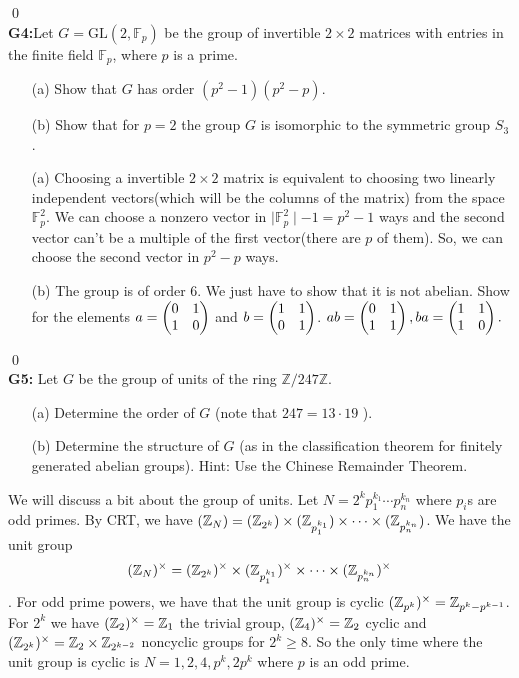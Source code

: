 \qed\\
\textbf{G4:}Let $G=\mathrm{GL}\left(2, \mathbb{F}_p\right)$ be the group of invertible $2 \times 2$ matrices with entries in the finite field $\mathbb{F}_p$, where $p$ is a prime.
\begin{itemize}
	\item[(a)] Show that $G$ has order $\left(p^2-1\right)\left(p^2-p\right)$.
	\item[(b)] Show that for $p=2$ the group $G$ is isomorphic to the symmetric group $S_3$.
\end{itemize}
\soln
\begin{itemize}
	\item[(a)] Choosing a invertible $ 2\times2 $ matrix is equivalent to choosing two linearly independent vectors(which will be the columns of the matrix) from the space $ \mathbb{F}_p^2 $. We can choose a nonzero vector in $\mid \mathbb{F}_p^2\mid -1 =  p^2-1 $ ways and the second vector can't be a multiple of the first vector(there are $ p $ of them). So, we can choose the second vector in $ p^2-p $ ways.
	\item[(b)] The group is of order $ 6 $. We just have to show that it is not abelian. Show for the elements $a= \begin{pmatrix} 0 & 1\\ 1 & 0 \end{pmatrix} $ and $b= \begin{pmatrix} 1 & 1\\ 0 & 1 \end{pmatrix} $. $ ab=\begin{pmatrix} 0 & 1\\ 1 & 1 \end{pmatrix}, ba= \begin{pmatrix} 1 & 1\\ 1 & 0 \end{pmatrix}. $
\end{itemize}
\qed\\
\textbf{G5:} Let $G$ be the group of units of the ring $\mathbb{Z} / 247 \mathbb{Z}$.
\begin{itemize}
	\item[(a)] Determine the order of $G$ (note that $247=13 \cdot 19$ ).
	\item[(b)] Determine the structure of $G$ (as in the classification theorem for finitely generated abelian groups). Hint: Use the Chinese Remainder Theorem.
\end{itemize}
\soln
We will discuss a bit about the group of units. Let  $ N= 2^k p_1^{k_1}\cdots p_n^{k_n} $ where $ p_i $s are odd primes. By CRT, we have $ (\mathbb{Z}_N)= (\mathbb{Z}_{2^k})\times (\mathbb{Z}_{p_1^{k_1}}) \times \cdots\times (\mathbb{Z}_{p_n^{k_n}}) $. We have the unit group $$ (\mathbb{Z}_N)^\times= (\mathbb{Z}_{2^k})^\times\times (\mathbb{Z}_{p_1^{k_1}})^\times \times \cdots\times (\mathbb{Z}_{p_n^{k_n}})^\times $$. For odd prime powers, we have that the unit group is cyclic $ (\mathbb{Z}_{p^{k}})^\times = \mathbb{Z}_{p^k-p^{k-1}} $.\\
For $ 2^k $ we have $ (\mathbb{Z}_{2})^\times = \mathbb{Z}_1 $ the trivial group, $ (\mathbb{Z}_{4})^\times = \mathbb{Z}_2 $ cyclic and $ (\mathbb{Z}_{2^k})^\times = \mathbb{Z}_2 \times \mathbb{Z}_{2^{k-2}} $ noncyclic groups for $ 2^k\ge 8 $. So the only time where the unit group is cyclic is $ N=1,2,4,p^k, 2p^k $ where $ p $ is an odd prime.\\

